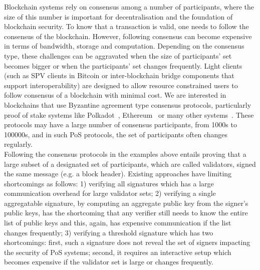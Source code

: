 Blockchain systems rely on consensus among a number of participants, where the size of this number is important for decentralisation and the foundation of blockchain security. To know that a transaction is valid, one needs to follow the consensus of the blockchain. However, following consensus can become expensive in 
terms of bandwidth, storage and computation. Depending on the consensus type, these challenges can be aggravated when the size of participants' set becomes bigger or when the participants' set changes frequently. Light clients (such as SPV clients in Bitcoin \cite{nakamoto2008bitcoin} or inter-blockchain bridge components that support interoperability) are designed to allow resource constrained users to follow consensus of a blockchain with 
minimal cost. We are interested in blockchains that use Byzantine agreement type consensus protocols, particularly proof of stake systems 
like Polkadot~\cite{polkadot}, Ethereum~\cite{ethereum}
or many other systems~\cite{cosmos,tendermint_paper, celo}. These protocols 
may have a large number of consensus participants, from 1000s to 100000s, and in such PoS protocols, the set of participants often changes regularly. \\

\vspace{-0.2cm}
\noindent Following the consensus protocols in the examples above entails proving that a large subset of a designated set of participants, 
which are called validators, signed the same message (e.g. a block header). Existing approaches have limiting shortcomings as follows:
1) verifying all signatures which has a large communication overhead for large validator sets;
2) verifying a single aggregatable signature, by computing an aggregate public key from the signer's public keys, has the shortcoming that any verifier still needs to know the entire list of public keys and this, again, has expensive communication if the list changes frequently; 
3) verifying a threshold signature which has two shortcomings: first, such a signature does not reveal the set of signers impacting the 
security of PoS systems; second, it requires an interactive setup which becomes expensive if the validator set is large or changes frequently.

\vspace{-0.2cm}
